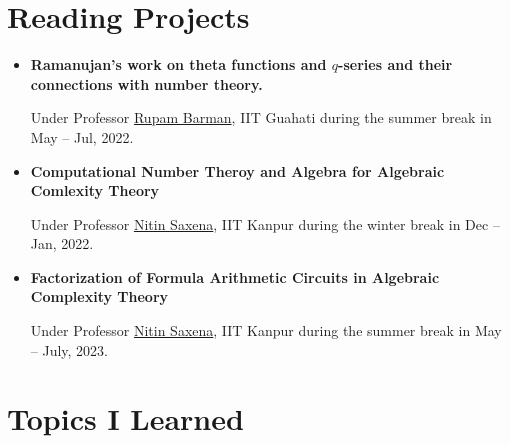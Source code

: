 \documentclass[10pt,a4paper,sans,colorlinks]{moderncv}        %
\begin{document}
\section{Reading Projects}
\begin{itemize}
	\item \textbf{Ramanujan's work on theta functions and $q$-series and their connections with number theory.}

	      \hfill Under Professor \href{https://www.iitg.ac.in/rupam/}{Rupam Barman}, IIT Guahati during the summer break in May -- Jul, 2022.

	\item \textbf{Computational Number Theroy and Algebra for Algebraic Comlexity Theory }

	      \hfill Under Professor \href{https://www.cse.iitk.ac.in/users/nitin/}{Nitin Saxena}, IIT Kanpur during the winter break in Dec -- Jan, 2022.
	      
	\item \textbf{Factorization of Formula Arithmetic Circuits in Algebraic Complexity Theory }
	
	\hfill Under Professor \href{https://www.cse.iitk.ac.in/users/nitin/}{Nitin Saxena}, IIT Kanpur during the summer break in May -- July, 2023.
\end{itemize}

\section{Topics I Learned}
\end{document}
